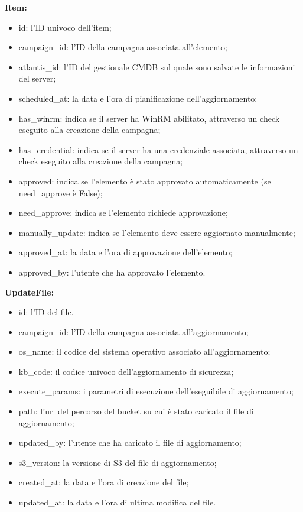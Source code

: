 \textbf{Item:}
\begin{itemize}
\item id: l'ID univoco dell’item;
\item campaign\_id: l’ID della campagna associata all'elemento;
\item atlantis\_id: l'ID del gestionale CMDB sul quale sono salvate le informazioni del server;
\item scheduled\_at: la data e l'ora di pianificazione dell'aggiornamento;
\item has\_winrm: indica se il server ha WinRM abilitato, attraverso un check eseguito alla creazione della campagna;
\item has\_credential: indica se il server ha una credenziale associata, attraverso un check eseguito alla creazione della campagna;
\item approved: indica se l'elemento è stato approvato automaticamente (se need\_approve è False);
\item need\_approve: indica se l'elemento richiede approvazione;
\item manually\_update: indica se l'elemento deve essere aggiornato manualmente;
\item approved\_at: la data e l'ora di approvazione dell'elemento;
\item approved\_by: l'utente che ha approvato l'elemento.
\end{itemize}

\textbf{UpdateFile:}
\begin{itemize}
\item id: l'ID del file.
\item campaign\_id: l'ID della campagna associata all'aggiornamento;
\item os\_name: il codice del sistema operativo associato all'aggiornamento;
\item kb\_code: il codice univoco dell'aggiornamento di sicurezza;
\item execute\_params: i parametri di esecuzione dell'eseguibile di aggiornamento;
\item path: l'url del percorso del bucket su cui è stato caricato il file di aggiornamento;
\item updated\_by: l'utente che ha caricato il file di aggiornamento;
\item s3\_version: la versione di S3 del file di aggiornamento;
\item created\_at: la data e l'ora di creazione del file;
\item updated\_at: la data e l'ora di ultima modifica del file.
\end{itemize}

